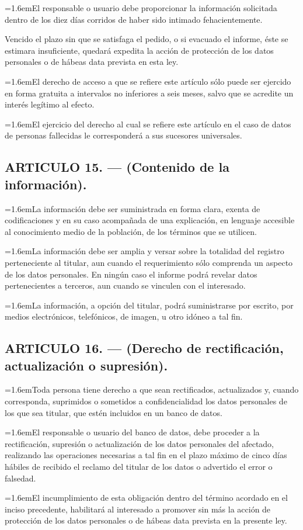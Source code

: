 \documentclass[10pt,a4paper]{article}
\newcommand{\articulo}[1]{\subsection{#1}}
\newcommand{\inciso}[2]{\par{\hangindent=1.6em\hangafter=1\makebox[1.6em][l]{#1}#2\par}}
\begin{document}
\inciso{2.}{El responsable o usuario debe proporcionar la información solicitada dentro de los diez días corridos de haber sido intimado fehacientemente.}

Vencido el plazo sin que se satisfaga el pedido, o si evacuado el informe, éste se estimara insuficiente, quedará expedita la acción de protección de los datos personales o de hábeas data prevista en esta ley.

\inciso{3.}{El derecho de acceso a que se refiere este artículo sólo puede ser ejercido en forma gratuita a intervalos no inferiores a seis meses, salvo que se acredite un interés legítimo al efecto.}

\inciso{4.}{El ejercicio del derecho al cual se refiere este artículo en el caso de datos de personas fallecidas le corresponderá a sus sucesores universales.}

\articulo{ARTICULO 15. — (Contenido de la información).}
\inciso{1.}{La información debe ser suministrada en forma clara, exenta de codificaciones y en su caso acompañada de una explicación, en lenguaje accesible al conocimiento medio de la población, de los términos que se utilicen.}

\inciso{2.}{La información debe ser amplia y versar sobre la totalidad del registro perteneciente al titular, aun cuando el requerimiento sólo comprenda un aspecto de los datos personales. En ningún caso el informe podrá revelar datos pertenecientes a terceros, aun cuando se vinculen con el interesado.}

\inciso{3.}{La información, a opción del titular, podrá suministrarse por escrito, por medios electrónicos, telefónicos, de imagen, u otro idóneo a tal fin.}

\articulo{ARTICULO 16. — (Derecho de rectificación, actualización o supresión).}
\inciso{1.}{Toda persona tiene derecho a que sean rectificados, actualizados y, cuando corresponda, suprimidos o sometidos a confidencialidad los datos personales de los que sea titular, que estén incluidos en un banco de datos.}

\inciso{2.}{El responsable o usuario del banco de datos, debe proceder a la rectificación, supresión o actualización de los datos personales del afectado, realizando las operaciones necesarias a tal fin en el plazo máximo de cinco días hábiles de recibido el reclamo del titular de los datos o advertido el error o falsedad.}

\inciso{3.}{El incumplimiento de esta obligación dentro del término acordado en el inciso precedente, habilitará al interesado a promover sin más la acción de protección de los datos personales o de hábeas data prevista en la presente ley.}
\end{document}

